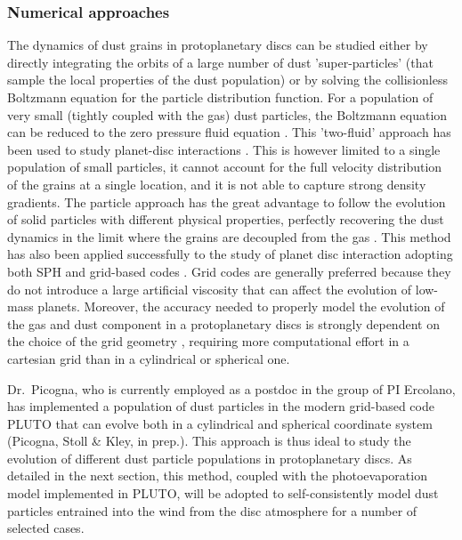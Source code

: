 \documentclass[10pt,fleqn,twoside]{article}
\begin{document}
\subsubsection{Numerical approaches}

The dynamics of dust grains in protoplanetary discs can be studied
either by directly integrating the orbits of a large number of dust
'super-particles' (that sample the local properties of the dust
population) or by solving the collisionless Boltzmann equation for the
particle distribution function. For a population of very small
(tightly coupled with the gas) dust particles, the Boltzmann equation
can be reduced to the zero pressure fluid equation 
\citep{1993Icar..106..102C, 2004ApJ...603..292G}.
This 'two-fluid' approach has been used to study
planet-disc interactions \citep[e.g.,][]{2004A&A...425L...9P, 
2006A&A...453.1129P, 2012ApJ...755....6Z}.
This is however limited to a single population of
small particles, it cannot account for the full velocity distribution
of the grains at a single location, and it is not able to capture
strong density gradients. The particle approach has the great
advantage to follow the evolution of solid particles with different
physical properties, perfectly recovering the dust dynamics in the
limit where the grains are decoupled from the gas 
\citep{2007ApJ...662..613Y, 2010JCoPh.229.3916M, 2010ApJ...722.1437B}.
This method has also been
applied successfully to the study of planet disc interaction adopting
both SPH and grid-based codes 
\citep{2007A&A...474.1037F, 2010A&A...518A..16F, 2012MNRAS.423.1450A,
2009A&A...493.1125L, 2014ApJ...795...53Z}. Grid codes are
generally preferred because they do not introduce a large artificial viscosity
that can affect the evolution of low-mass planets. Moreover, the
accuracy needed to properly model the evolution of the gas and dust
component in a protoplanetary discs is strongly dependent on the
choice of the grid geometry \citep{2009A&A...493.1125L, 
2006MNRAS.370..529D}, requiring more computational effort in a cartesian grid
than in a cylindrical or spherical one. 

Dr.\ Picogna, who is currently employed as a postdoc in the group of PI
Ercolano, has implemented a population of dust
particles in the modern grid-based code PLUTO \citep{2012A&A...545A.152M}
that can evolve both in a cylindrical and spherical coordinate system
(Picogna, Stoll \& Kley, in prep.). This approach is thus ideal to
study the evolution of different dust particle populations in
protoplanetary discs. As detailed in the next section, this method,
coupled with the photoevaporation model implemented in PLUTO, will be
adopted to self-consistently model dust particles entrained into the
wind from the disc atmosphere for a number of selected cases.
\end{document}

